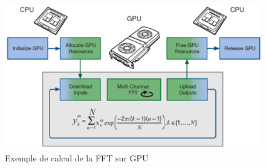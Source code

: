 \begin{figure}[H]
\centering
\includegraphics[scale=0.7]{images/gpuworkflow}
\caption{Exemple de calcul de la FFT sur GPU\protect\footnotemark}
\label{fig:gpgpu}
\end{figure}
